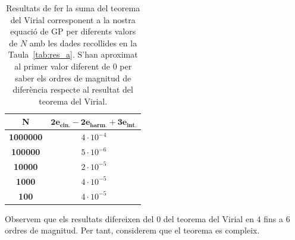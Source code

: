 \documentclass[a4paper]{article}
\begin{document}
\begin{table}[H]
    \centering
    \begin{tabular}{|c|c|}
        \hline
        \rowcolor[HTML]{EFEFEF}
        \textbf{N} & $\mathbf{2e_{\text{cin.}}-2e_{\text{harm.}}+3 e_{\text{int.}}}$ \\ \hline\hline
        \textbf{1000000} & $4\cdot10^{-4}$ \\ \hline
        \textbf{100000} & $5\cdot10^{-6}$ \\ \hline
        \textbf{10000} & $2\cdot10^{-5}$ \\ \hline
        \textbf{1000} & $4\cdot10^{-5}$ \\ \hline
        \textbf{100} & $4\cdot10^{-5}$ \\ \hline
    \end{tabular}
\caption{Resultats de fer la suma del teorema del Virial corresponent a la nostra equació de GP per diferents valors de $N$ amb les dades recollides en la Taula~\ref{tab:res_a}. S'han aproximat al primer valor diferent de $0$ per saber els ordres de magnitud de diferència respecte al resultat del teorema del Virial.}
\label{tab:res_d}
\end{table}

Observem que els resultats difereixen del $0$ del teorema del Virial en $4$ fins a $6$ ordres de magnitud. Per tant, considerem que el teorema es compleix.
\end{document}
